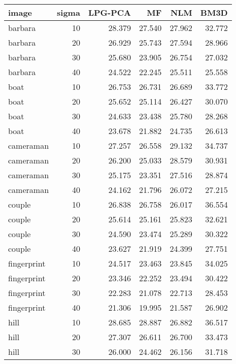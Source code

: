 \begin{tabular}{lrrrrr}
\toprule
       image &  sigma &  LPG-PCA &      MF &     NLM &    BM3D \\
\midrule
     barbara &     10 &   28.379 &  27.540 &  27.962 &  32.772 \\
     barbara &     20 &   26.929 &  25.743 &  27.594 &  28.966 \\
     barbara &     30 &   25.680 &  23.905 &  26.754 &  27.032 \\
     barbara &     40 &   24.522 &  22.245 &  25.511 &  25.558 \\
        boat &     10 &   26.753 &  26.731 &  26.689 &  33.772 \\
        boat &     20 &   25.652 &  25.114 &  26.427 &  30.070 \\
        boat &     30 &   24.633 &  23.438 &  25.780 &  28.268 \\
        boat &     40 &   23.678 &  21.882 &  24.735 &  26.613 \\
   cameraman &     10 &   27.257 &  26.558 &  29.132 &  34.737 \\
   cameraman &     20 &   26.200 &  25.033 &  28.579 &  30.931 \\
   cameraman &     30 &   25.175 &  23.351 &  27.516 &  28.874 \\
   cameraman &     40 &   24.162 &  21.796 &  26.072 &  27.215 \\
      couple &     10 &   26.838 &  26.758 &  26.017 &  36.554 \\
      couple &     20 &   25.614 &  25.161 &  25.823 &  32.621 \\
      couple &     30 &   24.590 &  23.474 &  25.289 &  30.322 \\
      couple &     40 &   23.627 &  21.919 &  24.399 &  27.751 \\
 fingerprint &     10 &   24.517 &  23.463 &  23.845 &  34.025 \\
 fingerprint &     20 &   23.346 &  22.252 &  23.494 &  30.422 \\
 fingerprint &     30 &   22.283 &  21.078 &  22.713 &  28.453 \\
 fingerprint &     40 &   21.306 &  19.995 &  21.587 &  26.902 \\
        hill &     10 &   28.685 &  28.887 &  26.882 &  36.517 \\
        hill &     20 &   27.307 &  26.611 &  26.700 &  33.473 \\
        hill &     30 &   26.000 &  24.462 &  26.156 &  31.718 \\

\end{tabular}
